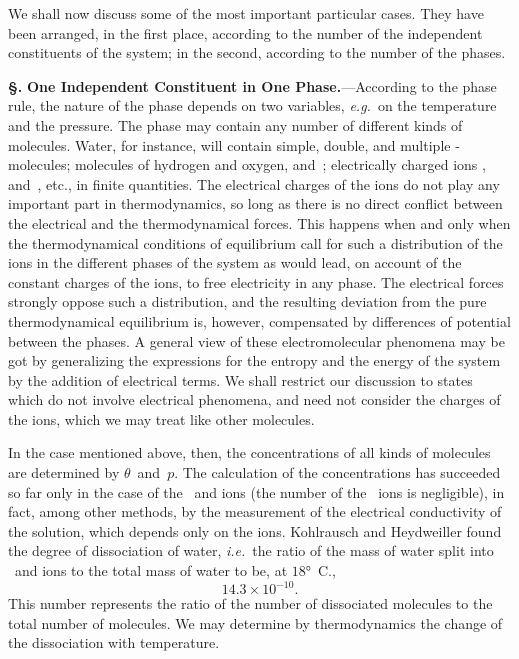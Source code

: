 \documentclass[12pt]{book}[2005/09/16]
\newcommand{\Section}[1]{
  \medskip\par\textbf{§\;#1}
  \label{section:#1}
}
\newcommand{\PageSep}[1]{\ignorespaces}
\newcommand{\Topic}[1]{\textbf{#1}}
\newcommand{\eg}{\emph{e.g.}}
\newcommand{\ie}{\emph{i.e.}}
\begin{document}
We shall now discuss some of the most important particular
cases. They have been arranged, in the first place, according
to the number of the independent constituents of the
system; in the second, according to the number of the
phases.

\Section{260.} \Topic{One Independent Constituent in One Phase.}---According
to the phase rule, the nature of the phase depends
on two variables, \eg\ on the temperature and the pressure.
The phase may contain any number of different kinds of
molecules. Water, for instance, will contain simple, double,
\PageSep{234}
and multiple -molecules; molecules of hydrogen and
oxygen,  and~; electrically charged ions ,~ and~,
etc., in finite quantities. The electrical charges of the
ions do not play any important part in thermodynamics, so
long as there is no direct conflict between the electrical
and the thermodynamical forces. This happens when and
only when the thermodynamical conditions of equilibrium
call for such a distribution of the ions in the different phases
of the system as would lead, on account of the constant
charges of the ions, to free electricity in any phase. The
electrical forces strongly oppose such a distribution, and the
resulting deviation from the pure thermodynamical equilibrium
is, however, compensated by differences of potential
between the phases. A general view of these electromolecular
phenomena may be got by generalizing the expressions for
the entropy and the energy of the system by the addition
of electrical terms. We shall restrict our discussion to
states which do not involve electrical phenomena, and need
not consider the charges of the ions, which we may treat
like other molecules.

In the case mentioned above, then, the concentrations of
all kinds of molecules are determined by $\theta$~and~$p$. The
calculation of the concentrations has succeeded so far only
in the case of the ~and  ions (the number of the
~ions is negligible), in fact, among other methods, by the
measurement of the electrical conductivity of the solution,
which depends only on the ions. Kohlrausch and Heydweiller
%
%
found the degree of dissociation of water, \ie\ the ratio of
%
%
the mass of water split into ~and  ions to the total
mass of water to be, at $18°$~C.,
\[
14.3 × 10^{-10}.
\]
This number represents the ratio of the number of dissociated
molecules to the total number of molecules. We
may determine by thermodynamics the change of the dissociation
with temperature.
\PageSep{235}
\end{document}
